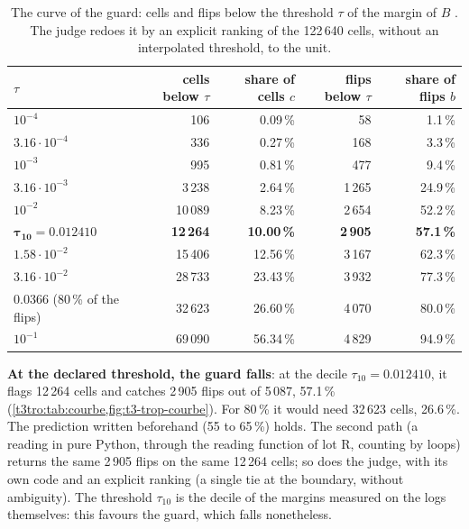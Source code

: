 \begin{table}[tbp]
\centering\small
\caption[The curve of the guard]{The curve of the guard: cells and flips below the threshold $\tau$ of the margin of $B$ \mes. The judge redoes it by an explicit ranking of the 122\,640 cells, without an interpolated threshold, to the unit.}
\label{t3tro:tab:courbe}
\begin{tabular}{@{}lrrrr@{}}
\toprule
$\tau$ & cells below $\tau$ & share of cells $c$ & flips below $\tau$ & share of flips $b$ \\
\midrule
$10^{-4}$ & 106 & 0.09\,\% & 58 & 1.1\,\% \\
$3.16 \cdot 10^{-4}$ & 336 & 0.27\,\% & 168 & 3.3\,\% \\
$10^{-3}$ & 995 & 0.81\,\% & 477 & 9.4\,\% \\
$3.16 \cdot 10^{-3}$ & 3\,238 & 2.64\,\% & 1\,265 & 24.9\,\% \\
$10^{-2}$ & 10\,089 & 8.23\,\% & 2\,654 & 52.2\,\% \\
$\boldsymbol{\tau_{10} = 0.012410}$ & \textbf{12\,264} & \textbf{10.00\,\%} & \textbf{2\,905} & \textbf{57.1\,\%} \\
$1.58 \cdot 10^{-2}$ & 15\,406 & 12.56\,\% & 3\,167 & 62.3\,\% \\
$3.16 \cdot 10^{-2}$ & 28\,733 & 23.43\,\% & 3\,932 & 77.3\,\% \\
$0.0366$ (80\,\% of the flips) & 32\,623 & 26.60\,\% & 4\,070 & 80.0\,\% \\
$10^{-1}$ & 69\,090 & 56.34\,\% & 4\,829 & 94.9\,\% \\
\bottomrule
\end{tabular}
\end{table}

\textbf{At the declared threshold, the guard falls}: at the decile $\tau_{10} = 0.012410$, it flags 12\,264 cells and catches 2\,905 flips out of 5\,087, 57.1\,\% (\cref{t3tro:tab:courbe,fig:t3-trop-courbe}). For 80\,\% it would need 32\,623 cells, 26.6\,\%. The prediction written beforehand (55 to 65\,\%) holds. The second path (a reading in pure Python, through the reading function of lot R, counting by loops) returns the same 2\,905 flips on the same 12\,264 cells; so does the judge, with its own code and an explicit ranking (a single tie at the boundary, without ambiguity). The threshold $\tau_{10}$ is the decile of the margins measured on the logs themselves: this favours the guard, which falls nonetheless.

